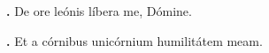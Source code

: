 \textbf{\Vbar.} De ore leónis líbera me, Dómine.

\textbf{\Rbar.} Et a córnibus unicórnium humilitátem meam.

